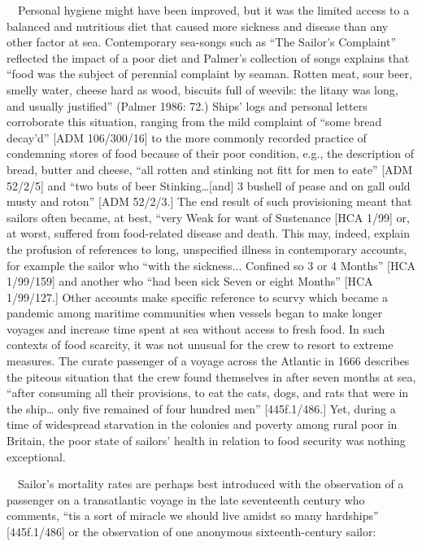\begin{styleStandard}
\ \ Personal hygiene might have been improved, but it was the limited access to a balanced and nutritious diet that caused more sickness and disease than any other factor at sea. Contemporary sea-songs such as “The Sailor’s Complaint” reflected the impact of a poor diet and Palmer’s collection of songs explains that “food was the subject of perennial complaint by seaman. Rotten meat, sour beer, smelly water, cheese hard as wood, biscuits full of weevils: the litany was long, and usually justified” (Palmer 1986: 72.) Ships’ logs and personal letters corroborate this situation, ranging from the mild complaint of “some bread decay'd” [ADM 106/300/16] to the more commonly recorded practice of condemning stores of food because of their poor condition, e.g., the description of bread, butter and cheese, “all rotten and stinking not fitt for men to eate” [ADM 52/2/5] and “two buts of beer Stinking…[and] 3 bushell of pease and on gall ould musty and roton” [ADM 52/2/3.] The end result of such provisioning meant that sailors often became, at best, “very Weak for want of Sustenance{\textquotedbl} [HCA 1/99] or, at worst, suffered from food-related disease and death. This may, indeed, explain the profusion of references to long, unspecified illness in contemporary accounts, for example the sailor who “with the sickness... Confined so 3 or 4 Months” [HCA 1/99/159] and another who “had been sick Seven or eight Months” [HCA 1/99/127.] Other accounts make specific reference to scurvy which became a pandemic among maritime communities when vessels began to make longer voyages and increase time spent at sea without access to fresh food. In such contexts of food scarcity, it was not unusual for the crew to resort to extreme measures. The curate passenger of a voyage across the Atlantic in 1666 describes the piteous situation that the crew found themselves in after seven months at sea, “after consuming all their provisions, to eat the cats, dogs, and rats that were in the ship… only five remained of four hundred men” [445f.1/486.] Yet, during a time of widespread starvation in the colonies and poverty among rural poor in Britain, the poor state of sailors’ health in relation to food security was nothing exceptional. 
\end{styleStandard}

\begin{styleStandard}
\ \ Sailor’s mortality rates are perhaps best introduced with the observation of a passenger on a transatlantic voyage in the late seventeenth century who comments, “tis a sort of miracle we should live amidst so many hardships” [445f.1/486] or the observation of one anonymous sixteenth-century sailor:
\end{styleStandard}

